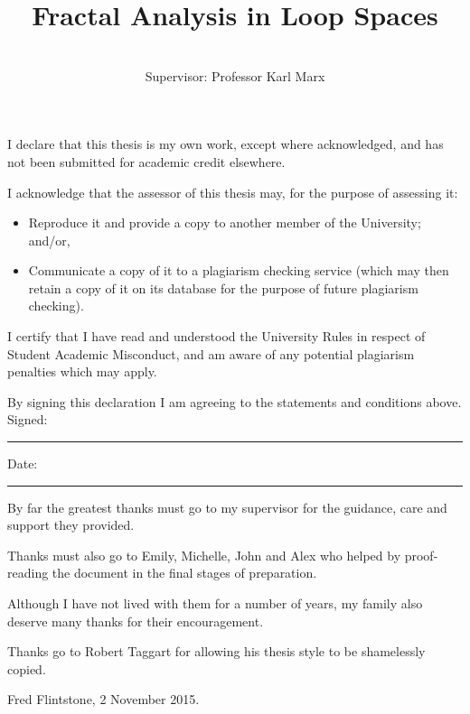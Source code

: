 \documentclass[12pt]{UNSWthesis}
\title{Fractal Analysis in Loop Spaces}
\author{\authornameonly\\{\bigskip}Supervisor: Professor Karl Marx}
\newcommand\blankpage{%
    \null
    \thispagestyle{empty}%
    \addtocounter{page}{-1}%
    \newpage}
\numberwithin{equation}{section}
\begin{document}
\beforepreface

\afterpage{\blankpage}



\vskip 10pc \noindent I declare that this thesis is my
own work, except where acknowledged, and has not been submitted for
academic credit elsewhere. 

\vskip 2pc  \noindent I acknowledge that the assessor of this
thesis may, for the purpose of assessing it:
\begin{itemize}
\item Reproduce it and provide a copy to another member of the University; and/or,
\item Communicate a copy of it to a plagiarism checking service (which may then retain a copy of it on its database for the purpose of future plagiarism checking).
\end{itemize}

\vskip 2pc \noindent I certify that I have read and understood the University Rules in
respect of Student Academic Misconduct, and am aware of any potential plagiarism penalties which may 
apply.\vspace{24pt}

\vskip 2pc \noindent By signing 
this declaration I am
agreeing to the statements and conditions above.
\vskip 2pc \noindent
Signed: \rule{7cm}{0.25pt} \hfill Date: \rule{4cm}{0.25pt} \newline
\vskip 1pc

\afterpage{\blankpage}




{\bigskip}By far the greatest thanks must go to my supervisor for
the guidance, care and support they provided. 

{\bigskip\noindent}Thanks 
must also go to Emily, Michelle, John and Alex who helped by
proof-reading the document in the final stages of preparation.

{\bigskip\noindent}Although
I have not lived with them for a number of years, my family also deserve
many thanks for their encouragement.

{\bigskip\noindent} Thanks go to Robert Taggart for allowing his thesis
style to be shamelessly copied.

{\bigskip\bigskip\bigskip\noindent} Fred Flintstone, 2 November 2015.

\afterpage{\blankpage}
\end{document}
